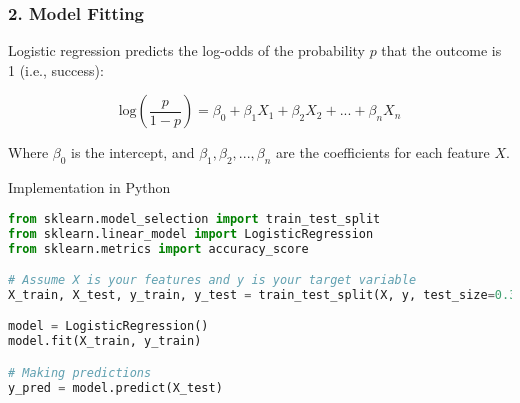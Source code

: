 \documentclass[aspectratio=169]{beamer}
\begin{document}
\begin{frame}[fragile]
  \frametitle{2. Model Fitting}
  Logistic regression predicts the log-odds of the probability \( p \) that the outcome is 1 (i.e., success):
  
  \begin{equation}
  \text{log} \left( \frac{p}{1 - p} \right) = \beta_0 + \beta_1X_1 + \beta_2X_2 + ... + \beta_nX_n
  \end{equation}

  Where \( \beta_0 \) is the intercept, and \( \beta_1, \beta_2, ..., \beta_n \) are the coefficients for each feature \( X \).

  \begin{block}{Implementation in Python}
  \begin{lstlisting}[language=Python]
from sklearn.model_selection import train_test_split
from sklearn.linear_model import LogisticRegression
from sklearn.metrics import accuracy_score

# Assume X is your features and y is your target variable
X_train, X_test, y_train, y_test = train_test_split(X, y, test_size=0.3, random_state=42)

model = LogisticRegression()
model.fit(X_train, y_train)

# Making predictions
y_pred = model.predict(X_test)
  \end{lstlisting}
  \end{block}
\end{frame}
\end{document}
